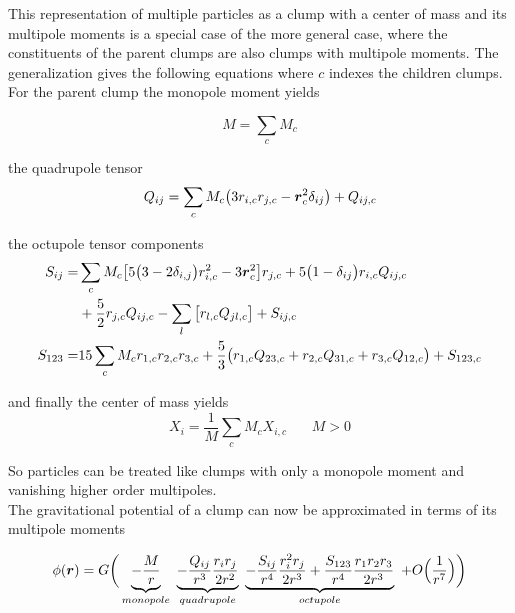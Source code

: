 This representation of multiple particles as a clump with a center of mass and its multipole moments is a special case of the more general case, where the constituents of the parent clumps are also clumps with multipole moments. The generalization gives the following equations where $c$ indexes the children clumps. For the parent clump the monopole moment yields

\begin{equation}
\label{eq_monopole}
M = \sum_{c} M_{c}
\end{equation}

the quadrupole tensor
\begin{equation}
\label{eq_quadrupole}
Q_{ij} = \sum_{c} M_{c} \big( 3 r_{i, c} r_{j, c} - \boldsymbol{r}_{c}^{2} \delta_{i j} \big) + Q_{i j, c} 
\end{equation}

the octupole tensor components
\begin{align}
\label{eq_octupole}
S_{ij} =& \sum_{c}  M_{c} \big[ 5 \big( 3 - 2 \delta_{i,j} \big) r_{i, c}^{2} - 3 \boldsymbol{r}_{c}^2 \big] r_{j, c} 
+ 5 \big( 1 - \delta_{i j} \big) r_{i, c} Q_{i j, c} \nonumber \\
&+ \frac{5}{2} r_{j, c} Q_{i j, c} - \sum_{l} \big[ r_{l, c} Q_{j l, c} \big] + S_{i j, c} \\
S_{1 2 3} =& 15 \sum_{c} M_{c} r_{1, c} r_{2, c} r_{3, c} + \frac{5}{3} \big( r_{1, c} Q_{2 3, c} + r_{2, c} Q_{3 1, c} + r_{3, c} Q_{1 2, c} \big) + S_{1 2 3, c }
\end{align}

and finally the center of mass yields
\begin{equation}
X_{i} = \frac{1}{M} \sum_{c} M_{c} X_{i, c} ~~~~~~~~  M > 0
\end{equation}

So particles can be treated like clumps with only a monopole moment and vanishing higher order multipoles.\\

The gravitational potential of a clump can now be approximated in terms of its multipole moments

\begin{equation}
\phi(\boldsymbol{r}) = G \bigg(
\underbrace{ - \frac{M}{r} }_{monopole} ~ 
\underbrace{ - \frac{Q_{i j}}{r^{3}} \frac{r_{i} r_{j} }{2 r^{2} } }_{quadrupole}~ 
\underbrace{ - \frac{S_{i j}}{r^{4}} \frac{r_{i}^2 r_{j}}{2 r^{3} } + \frac{ S_{1 2 3} }{r^{4}}\frac{ r_{1} r_{2} r_{3} }{2 r^{3}} }_{octupole}~ 
+ O\Big(\frac{1}{r^{7}}\Big) \bigg)
\end{equation}

